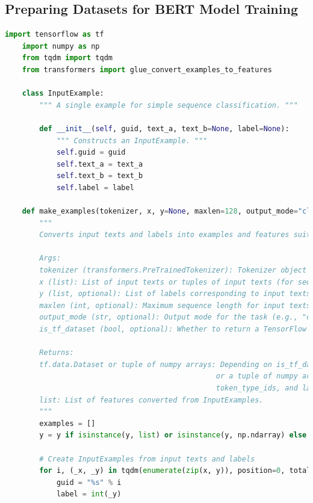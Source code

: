 \documentclass{solutionclass} %
\begin{document}
\begin{solution}
    \subsection*{Preparing Datasets for BERT Model Training}

    \begin{lstlisting}[language=Python, basicstyle=\ttfamily\footnotesize, keywordstyle=\color{blue}, commentstyle=\color{gray}]
    import tensorflow as tf
    import numpy as np
    from tqdm import tqdm
    from transformers import glue_convert_examples_to_features
    
    class InputExample:
        """ A single example for simple sequence classification. """
        
        def __init__(self, guid, text_a, text_b=None, label=None):
            """ Constructs an InputExample. """
            self.guid = guid
            self.text_a = text_a
            self.text_b = text_b
            self.label = label
    
    def make_examples(tokenizer, x, y=None, maxlen=128, output_mode="classification", is_tf_dataset=True):
        """
        Converts input texts and labels into examples and features suitable for BERT model training.
    
        Args:
        tokenizer (transformers.PreTrainedTokenizer): Tokenizer object for tokenizing input texts.
        x (list): List of input texts or tuples of input texts (for sequence classification).
        y (list, optional): List of labels corresponding to input texts. Default is None.
        maxlen (int, optional): Maximum sequence length for input texts. Default is 128.
        output_mode (str, optional): Output mode for the task (e.g., "classification"). Default is "classification".
        is_tf_dataset (bool, optional): Whether to return a TensorFlow dataset or numpy arrays. Default is True.
    
        Returns:
        tf.data.Dataset or tuple of numpy arrays: Depending on is_tf_dataset, returns either a TensorFlow dataset
                                                 or a tuple of numpy arrays containing input_ids, attention_masks,
                                                 token_type_ids, and labels.
        list: List of features converted from InputExamples.
        """
        examples = []
        y = y if isinstance(y, list) or isinstance(y, np.ndarray) else [None] * len(x)
    
        # Create InputExamples from input texts and labels
        for i, (_x, _y) in tqdm(enumerate(zip(x, y)), position=0, total=len(x)):
            guid = "%s" % i
            label = int(_y)
    

\end{lstlisting}
\end{solution}
\end{document}
